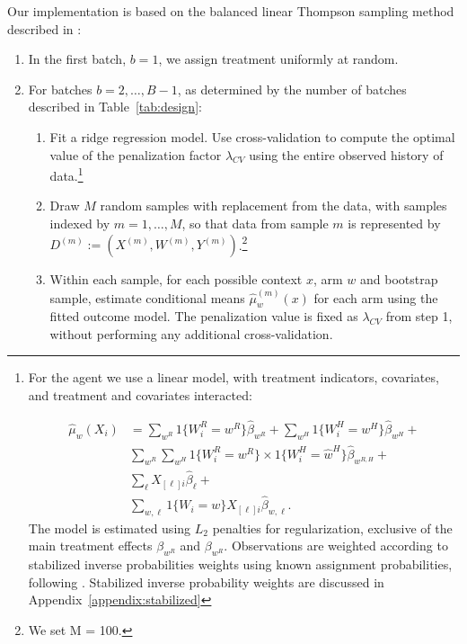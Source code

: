 \documentclass[letterpaper, 12pt, parskip=full,]{scrartcl}
\begin{document}
Our implementation is based on the balanced linear Thompson sampling method described in \cite{dimakopoulou2017estimation, dimakopoulou2019balanced} :

\begin{enumerate}
\item In the first batch, $b = 1$, we assign treatment uniformly at random. 


\item For batches $b = 2, \dots, B-1$, as determined by the number of batches described in Table~\ref{tab:design}:

\begin{enumerate}
	
 \item Fit a ridge regression model. Use cross-validation to compute the optimal value of the penalization factor $\lambda_{CV}$ using the entire observed history of data.\footnote{For the agent we use a linear model, with treatment indicators, covariates, and treatment and covariates interacted:
 
\begin{align*}
\hat{\mu}_w(X_{i}) & =
			\sum_{w^R} 1\{W^R_i = w^R\}\hat\beta_{w^R}  +
			\sum_{w^H} 1\{W^H_i = w^H\}\hat\beta_{w^H}  +\\ 
			& \sum_{w^R} \sum_{w^H}1\{W^R_i = w^R\} \times 1\{W^H_i =  \hat w^H\}\hat\beta_{w^{R,H}} +  \\
			& \sum_{\ell}  X_{[\ell]i}\hat{\beta}_{\ell} +\\
        &  \sum_{w,\ell} 1\{ W_{i} = w\} X_{[\ell]i} \hat{\beta}_{w, \ell}.
         \label{eq:linear_model_full}
\end{align*} 
The model is estimated using $L_{2}$ penalties for regularization, exclusive of the main treatment effects $\beta_{w^R}$ and $\beta_{w^R}$. Observations are weighted according to stabilized inverse probabilities weights using known assignment probabilities, following \cite{dimakopoulou2017estimation}. Stabilized inverse probability weights are discussed in Appendix~\ref{appendix:stabilized}
}

  \item \label{step:draw} Draw $M$ random samples with replacement from the data, with samples indexed by $m = 1, \dots, M$, so that data from sample $m$ is represented by $D^{(m)} := (X^{(m)}, W^{(m)}, Y^{(m)})$.\footnote{We set M = 100.} 

  \item Within each sample, for each possible context $x$, arm $w$ and bootstrap sample, estimate conditional means  $\hat{\mu}_w^{(m)}(x)$ for each arm using the fitted outcome model. The penalization value is fixed as $\lambda_{CV}$ from step 1, without performing any additional cross-validation.
  

\end{enumerate}
\end{enumerate}
\end{document}
